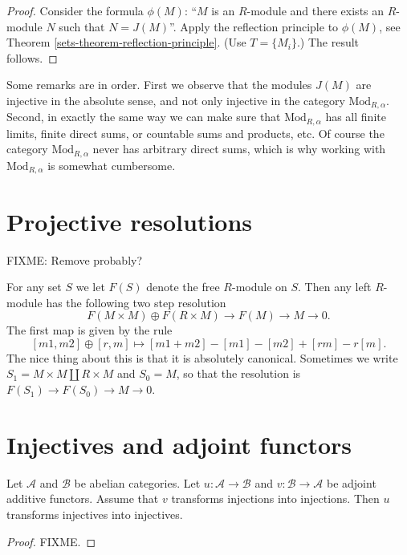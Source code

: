 \begin{proof}
Consider the formula $\phi(M)$: ``$M$ is an $R$-module and there exists
an $R$-module $N$ such that $N=J(M)$''. Apply the reflection principle to
$\phi(M)$, see  Theorem \ref{sets-theorem-reflection-principle}. (Use $T = 
\{M_i\}$.)
The result follows.
\end{proof}

\noindent
Some remarks are in order. First we observe that the modules $J(M)$
are injective in the absolute sense, and not only injective in the
category $\text{Mod}_{R,\alpha}$. Second, in exactly the same way we
can make sure that $\text{Mod}_{R,\alpha}$ has all finite limits,
finite direct sums, or countable sums and products, etc. Of course
the category $\text{Mod}_{R,\alpha}$ never has arbitrary direct sums,
which is why working with $\text{Mod}_{R,\alpha}$ is somewhat cumbersome.

\section{Projective resolutions}
\label{section-projective-resolution}

\noindent
FIXME: Remove probably?

\noindent
For any set $S$ we let $F(S)$ denote the free $R$-module on $S$.
Then any left $R$-module has the following two step resolution
$$
F(M\times M) \oplus F(R\times M) \to F(M) \to M \to 0.
$$
The first map is given by the rule
$$
[m1,m2] \oplus [r,m] \mapsto [m1+m2]-[m1]-[m2]+[rm]-r[m].
$$
The nice thing about this is that it is absolutely canonical.
Sometimes we write $S_1 = M\times M \coprod R\times M$ and
$S_0=M$, so that the resolution is $F(S_1) \to F(S_0) \to M \to 0$.

\section{Injectives and adjoint functors}
\label{section-adjoint}

\begin{lemma}
\label{lemma-adjoint}
Let $\mathcal{A}$ and $\mathcal{B}$ be abelian categories.
Let $u : \mathcal{A} \to \mathcal{B}$ and
$v : \mathcal{B} \to \mathcal{A}$ be adjoint additive functors.
Assume that $v$ transforms injections into injections.
Then $u$ transforms injectives into injectives.
\end{lemma}

\begin{proof}
FIXME.
\end{proof}


